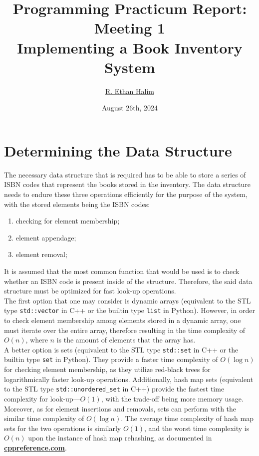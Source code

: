 \documentclass[12pt]{article}
\title{Programming Practicum Report: \\ Meeting 1 \\ Implementing a Book Inventory System}
\author{\href{https://github.com/avaxar}{R. Ethan Halim}}
\date{August 26th, 2024}
\begin{document}
\maketitle

\section{Determining the Data Structure}

The necessary data structure that is required has to be able to store a series of ISBN codes that represent the books stored in the inventory. The data structure needs to endure these three operations efficiently for the purpose of the system, with the stored elements being the ISBN codes:
\begin{enumerate}
    \item checking for element membership;
    \item element appendage;
    \item element removal;
\end{enumerate}
It is assumed that the most common function that would be used is to check whether an ISBN code is present inside of the structure. Therefore, the said data structure must be optimized for fast look-up operations.\\

The first option that one may consider is dynamic arrays (equivalent to the STL type \texttt{std::vector} in C++ or the builtin type \texttt{list} in Python). However, in order to check element membership among elements stored in a dynamic array, one must iterate over the entire array, therefore resulting in the time complexity of $O(n)$, where $n$ is the amount of elements that the array has.\\

A better option is sets (equivalent to the STL type \texttt{std::set} in C++ or the builtin type \texttt{set} in Python). They provide a faster time complexity of $O(\log n)$ for checking element membership, as they utilize red-black trees for logarithmically faster look-up operations. Additionally, hash map sets (equivalent to the STL type \texttt{std::unordered\_set} in C++) provide the fastest time complexity for look-up---$O(1)$, with the trade-off being more memory usage.\\

Moreover, as for element insertions and removals, sets can perform with the similar time complexity of $O(\log n)$. The average time complexity of hash map sets for the two operations is similarly $O(1)$, and the worst time complexity is $O(n)$ upon the instance of hash map rehashing, as documented in \href{https://en.cppreference.com/w/cpp/container/unordered_set/insert}{\textbf{cppreference.com}}.\\
\end{document}

